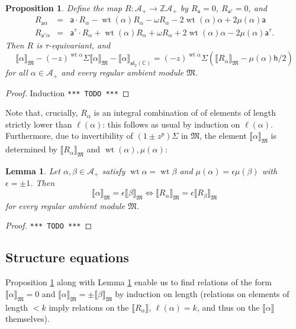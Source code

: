 \documentclass{article}
\def\MISS{\texttt{*** TODO ***}}
\def\llb{\llbracket}
\def\rrb{\rrbracket}
\def\fsl{\mathfrak{sl}}
\def\fM{\mathfrak{M}}
\def\sA{\mathscr{A}}
\def\ZZ{\mathbb{Z}}
\def\CC{\mathbb{C}}
\def\inv{\tau} %
\DeclareMathOperator{\wt}{\mathrm{wt}}
\def\a{\mathsf{a}}
\def\h{\mathsf{h}}
\def\R{R}
\newtheorem{lem}{Lemma}
\newtheorem{prop}{Proposition}
\theoremstyle{definition}
\begin{document}
\begin{prop}\label{pro:rests}
Define the map $\R : \sA_+ \to \ZZ\sA_+$ by 
$\R_\a = 0$, $\R_{\a^\inv} = 0$, and
\begin{eqnarray*}
        \R_{\a\alpha} &=& \a\cdot \R_\alpha - \wt(\alpha) \R_\alpha - \omega \R_\alpha - 2\wt(\alpha)\alpha
        + 2\mu(\alpha)\a \\
        \R_{\a^\inv\alpha} &=& \a^\inv\cdot \R_\alpha + \wt(\alpha) \R_\alpha + \omega \R_\alpha + 2\wt(\alpha)\alpha
        - 2\mu(\alpha)\a^\inv.
\end{eqnarray*}
Then $\R$ is $\inv$-equivariant, and
$$
\llb \alpha\rrb_\fM - (-z)^{\wt\alpha} \Sigma \llb \alpha\rrb_\fM - \llb\alpha\rrb_{\fsl_2(\CC)}
= (-z)^{\wt\alpha} \Sigma\left( \llb\R_\alpha\rrb_\fM - \mu(\alpha)\h/2 \right)
$$
for all $\alpha\in\sA_+$ and every regular ambient module $\fM$.
\end{prop}
\begin{proof}
Induction \MISS
\end{proof}

Note that, crucially, $R_\alpha$ is an integral combination of
of elements of length strictly lower than $\ell(\alpha)$: this
follows as usual by induction on $\ell(\alpha)$. 
Furthermore, due to invertibility of
$(1 \pm z^p)\Sigma$ in $\fM$, 
the element
$\llb\alpha\rrb_\fM$ is determined by
$\llb R_\alpha\rrb_\fM$ and $\wt(\alpha),\mu(\alpha)$:
\begin{lem}\label{lem:rinj}
        Let $\alpha,\beta\in\sA_+$
        satisfy $\wt\alpha=\wt\beta$
        and $\mu(\alpha) = \epsilon \mu(\beta)$
        with $\epsilon = \pm1$.
        Then
        $$
        \llb \alpha\rrb_\fM = \epsilon \llb \beta\rrb_\fM
        \iff
        \llb \R_\alpha \rrb_\fM = \epsilon \llb \R_\beta\rrb_\fM 
        $$
        for every regular ambient module $\fM$.
\end{lem}
\begin{proof}\MISS
\end{proof}

\subsection{Structure equations}

Proposition \ref{pro:rests} along with Lemma \ref{lem:rinj}
enable us to find relations of the form
$\llb\alpha\rrb_\fM=0$ and $\llb \alpha\rrb_\fM = \pm\llb\beta\rrb_\fM$
by induction on length (relations
on elements of length $<k$  imply relations on the
$\llb R_\alpha\rrb$, $\ell(\alpha)=k$,
and thus on the $\llb \alpha\rrb$ themselves).
\end{document}
